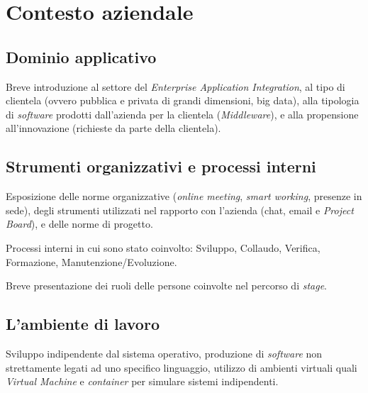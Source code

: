\chapter{Contesto aziendale}

\section{Dominio applicativo}
Breve introduzione al settore del \textit{Enterprise Application Integration}, al tipo di clientela (ovvero pubblica e privata di grandi dimensioni, big data), alla tipologia di \textit{software} prodotti dall’azienda per la clientela (\textit{Middleware}), e alla propensione all’innovazione (richieste da parte della clientela).

\section{Strumenti organizzativi e processi interni}

Esposizione delle norme organizzative (\textit{online meeting}, \textit{smart working}, presenze in sede), degli strumenti utilizzati nel rapporto con l’azienda (chat, email e \textit{Project Board}), e delle norme di progetto.

\bigskip\noindent
Processi interni in cui sono stato coinvolto: Sviluppo, Collaudo, Verifica, Formazione, Manutenzione/Evoluzione.

\bigskip\noindent
Breve presentazione dei ruoli delle persone coinvolte nel percorso di \textit{stage}.

\section{L’ambiente di lavoro}

Sviluppo indipendente dal sistema operativo, produzione di \textit{software} non strettamente legati ad uno specifico linguaggio, utilizzo di ambienti virtuali quali \textit{Virtual Machine} e \textit{container} per simulare sistemi indipendenti.
